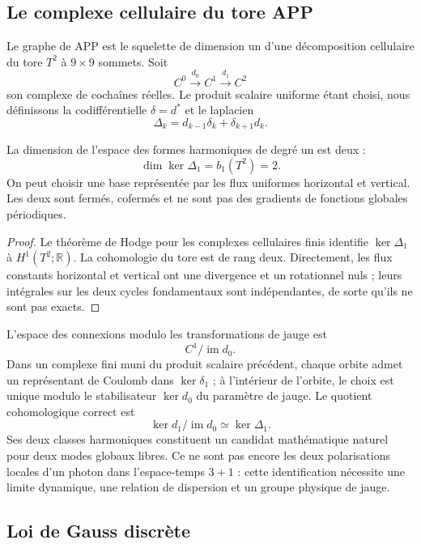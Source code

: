 \subsection{Le complexe cellulaire du tore APP}
\label{v:v:rec:completaciones:section:08}

Le graphe de APP est le squelette de dimension un d’une décomposition cellulaire du tore
\(T^2\) à \(9\times9\) sommets. Soit
\[
 C^0\xrightarrow{d_0}C^1\xrightarrow{d_1}C^2
\]
son complexe de cochaînes réelles. Le produit scalaire uniforme étant choisi,
nous définissons la codifférentielle \(\delta=d^*\) et le laplacien
\[
 \Delta_k=d_{k-1}\delta_k+\delta_{k+1}d_k.
\]

\begin{theorem}
\label{v:v:rec:completaciones:statement:04}
La dimension de l’espace des formes harmoniques de degré un est deux :
\[
 \dim\ker\Delta_1=b_1(T^2)=2.
\]
On peut choisir une base représentée par les flux uniformes horizontal et
vertical. Les deux sont fermés, cofermés et ne sont pas des gradients de fonctions
globales périodiques.
\end{theorem}

\begin{proof}
Le théorème de Hodge pour les complexes cellulaires finis identifie
\(\ker\Delta_1\) à \(H^1(T^2;\mathbb R)\). La cohomologie du tore est de
rang deux. Directement, les flux constants horizontal et vertical ont
une divergence et un rotationnel nuls ; leurs intégrales sur les deux cycles
fondamentaux sont indépendantes, de sorte qu’ils ne sont pas exacts.
\end{proof}

L’espace des connexions modulo les transformations de jauge est
\[
 C^1/\operatorname{im}d_0.
\]
Dans un complexe fini muni du produit scalaire précédent, chaque orbite
admet un représentant de Coulomb dans \(\ker\delta_1\) ; à l’intérieur de l’orbite,
le choix est unique modulo le stabilisateur \(\ker d_0\) du paramètre de
jauge. Le quotient cohomologique correct est
\[
 \ker d_1/\operatorname{im}d_0
 \simeq \ker\Delta_1 .
\]
Ses deux classes harmoniques constituent un candidat mathématique naturel pour
deux modes globaux libres. Ce ne sont pas encore les deux polarisations locales d’un
photon dans l’espace-temps \(3+1\) : cette identification nécessite une
limite dynamique, une relation de dispersion et un groupe physique de jauge.

\subsection{Loi de Gauss discrète}
\label{v:v:rec:completaciones:section:09}


